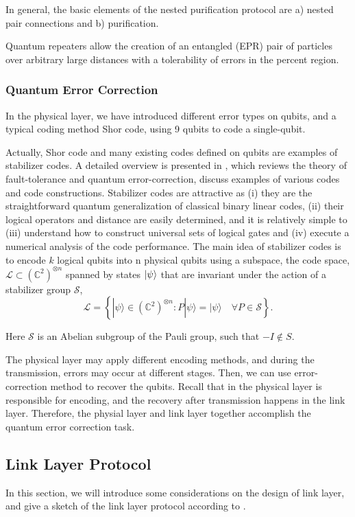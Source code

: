 \documentclass[10pt]{article}
\begin{document}
In general, the basic elements of the nested purification protocol are a) nested pair connections and b) purification. 

Quantum repeaters allow the creation of an entangled (EPR) pair of particles over arbitrary large distances with a tolerability of errors in the percent region. 

\subsubsection{Quantum Error Correction}
In the physical layer, we have introduced different error types on qubits, and a typical coding method Shor code, using 9 qubits to code a single-qubit. 

Actually, Shor code and many existing codes defined on qubits are examples of stabilizer codes. A detailed overview is presented in \cite{terhal2015quantum}, which reviews the theory of fault-tolerance and quantum error-correction, discuss
examples of various codes and code constructions. Stabilizer codes are attractive as (i) they are the straightforward quantum generalization of classical binary linear codes, (ii) their logical operators and distance are easily determined, and it is relatively simple to (iii) understand how to construct universal sets of logical gates and (iv) execute a numerical analysis of the code performance. The main idea of stabilizer codes is to encode $k$ logical qubits into n physical qubits using a subspace, the code space, $\mathcal L\subset (\mathbb{C}^2)^{\otimes n} $ spanned by states $\ket{\psi}$ that are
invariant under the action of a stabilizer group $\mathcal S$,
$$\mathcal{L}=\left\{|\psi\rangle \in\left(\mathbb{C}^{2}\right)^{\otimes n}: P|\psi\rangle=|\psi\rangle \quad \forall P \in \mathcal{S}\right\}.$$

Here $\mathcal S$ is an Abelian subgroup of the Pauli group, such that $-I\notin S$.

The physical layer may apply different encoding methods, and during the transmission, errors may occur at different stages. Then, we can use error-correction method to recover the qubits. Recall that in the physical layer is responsible for encoding, and the recovery after transmission happens in the link layer. Therefore, the physial layer and link layer together accomplish the quantum error correction task.

\subsection{Link Layer Protocol}
In this section, we will introduce some considerations on the design of link layer, and give a sketch of the link layer protocol according to \cite{dahlberg2019link}.
\end{document}
